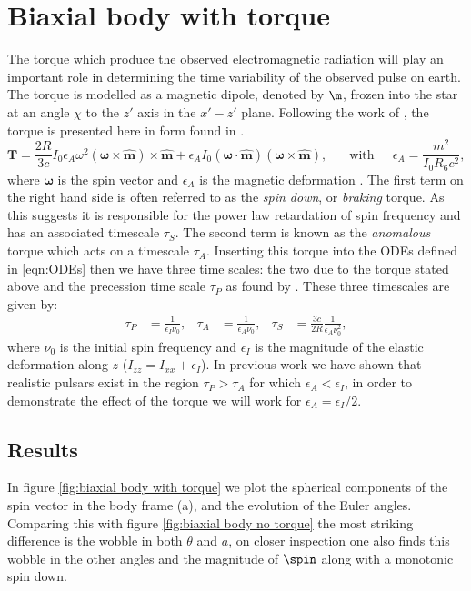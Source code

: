 \documentclass[/home/greg/Thesis/main/main.tex]{subfiles}
\begin{document}
\section{Biaxial body with torque}
The torque which produce the observed electromagnetic radiation will play an important role in determining the time variability of the observed pulse on earth. The torque is modelled as a magnetic dipole, denoted by $\m$, frozen into the star at an angle $\chi$ to the $z'$ axis in the $x'-z'$ plane. Following the work of \citet{Deutsch1955}, the torque is presented here in form found in \citet{Goldreich1970}.
\begin{equation}
\boldsymbol{T}=\frac{2R}{3c} I_{0}\epsilon_{A}\omega^{2}(\boldsymbol{\omega} \times \hat{\boldsymbol{m}})\times \hat{\boldsymbol{m}} + \epsilon_{A}I_{0}(\boldsymbol{\omega} \cdot \hat{\boldsymbol{m}})(\boldsymbol{\omega} \times \hat{\boldsymbol{m}}), \;\;\;\;\; \textrm{ with } \;\;\;\; \epsilon_{A} = \frac{m^{2}}{I_{0}R_{6}c^{2}},
\label{eqn:torque}
\end{equation}
where $\boldsymbol{\omega}$ is the spin vector and $\epsilon_{A}$ is the magnetic deformation \citep[see][]{Glampedakis2010}.
The first term on the right hand side is often referred to as the \emph{spin down}, or \emph{braking} torque. As this suggests it is responsible for the power law retardation of spin frequency and has an associated timescale $\tau_{S}$. The second term is known as the \emph{anomalous} torque which acts on a timescale $\tau_{A}$. Inserting this torque into the ODEs defined in \eqref{eqn:ODEs} then we have three time scales: the two due to the torque stated above and the precession time scale $\tau_{P}$ as found by \citet{Jones2001}. These three timescales are given by:
\begin{align}
\tau_{P} &= \frac{1}{\epsilon_{I}\nu_{0}},  &  \tau_{A}&=\frac{1}{\epsilon_{A}\nu_{0}}, & \tau_{S}&=\frac{3c}{2R}\frac{1}{\epsilon_{A}\nu_{0}^{2}},
\label{eqn:timescales}
\end{align} 
where $\nu_{0}$ is the initial spin frequency and $\epsilon_{I}$ is the magnitude of the elastic deformation along $z$ ($I_{zz} = I_{xx} + \epsilon_{I}$). In previous work we have shown %
that realistic pulsars exist in the region $\tau_{P} > \tau_{A}$ for which $\epsilon_{A} < \epsilon_{I}$, in order to demonstrate the effect of the torque we will work for $\epsilon_{A} = \epsilon_{I}/2$. 
\subsection{Results}
In figure \ref{fig:biaxial body with torque} we plot the spherical components of the spin vector in the body frame (a), and the evolution of the Euler angles. Comparing this with figure \ref{fig:biaxial body no torque} the most striking difference is the wobble in both $\theta$ and $a$, on closer inspection one also finds this wobble in the other angles and the magnitude of $\spin$ along with a monotonic spin down.
\end{document}
